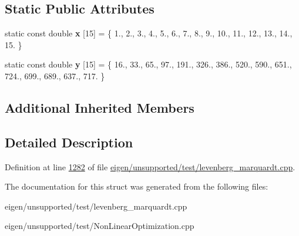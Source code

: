 \subsection*{Static Public Attributes}
\begin{DoxyCompactItemize}
\item 
\mbox{\label{structrat43__functor_a6cc315f2b6f919e0a44cf5513bf35b6e}} 
static const double {\bfseries x} \mbox{[}15\mbox{]} = \{ 1., 2., 3., 4., 5., 6., 7., 8., 9., 10., 11., 12., 13., 14., 15. \}
\item 
\mbox{\label{structrat43__functor_a6dc811fc15fdc0ce82c3024a9e04cb63}} 
static const double {\bfseries y} \mbox{[}15\mbox{]} = \{ 16., 33., 65., 97., 191., 326., 386., 520., 590., 651., 724., 699., 689., 637., 717. \}
\end{DoxyCompactItemize}
\subsection*{Additional Inherited Members}


\subsection{Detailed Description}


Definition at line \hyperlink{eigen_2unsupported_2test_2levenberg__marquardt_8cpp_source_l01282}{1282} of file \hyperlink{eigen_2unsupported_2test_2levenberg__marquardt_8cpp_source}{eigen/unsupported/test/levenberg\+\_\+marquardt.\+cpp}.



The documentation for this struct was generated from the following files\+:\begin{DoxyCompactItemize}
\item 
eigen/unsupported/test/levenberg\+\_\+marquardt.\+cpp\item 
eigen/unsupported/test/\+Non\+Linear\+Optimization.\+cpp\end{DoxyCompactItemize}
